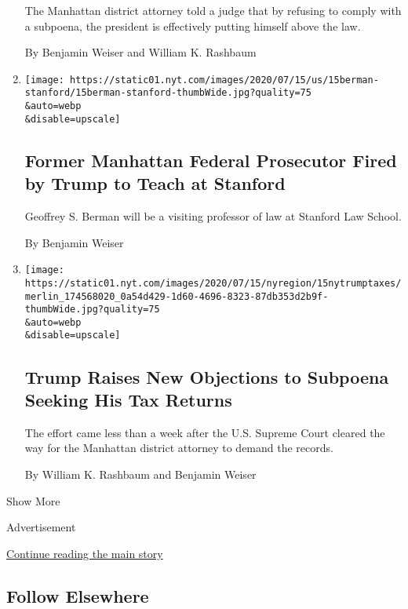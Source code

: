 \begin{enumerate}
  The Manhattan district attorney told a judge that by refusing to
  comply with a subpoena, the president is effectively putting himself
  above the law.

  By Benjamin Weiser and William K. Rashbaum
\item
  \href{/2020/07/15/us/Geoffrey-Berman-fired-stanford.html}{}

  \texttt{[image: https://static01.nyt.com/images/2020/07/15/us/15berman-stanford/15berman-stanford-thumbWide.jpg?quality=75\\\&auto=webp\\\&disable=upscale]}

  \hypertarget{former-manhattan-federal-prosecutor-fired-by-trump-to-teach-at-stanford}{%
  \subsection{Former Manhattan Federal Prosecutor Fired by Trump to
  Teach at
  Stanford}\label{former-manhattan-federal-prosecutor-fired-by-trump-to-teach-at-stanford}}

  Geoffrey S. Berman will be a visiting professor of law at Stanford Law
  School.

  By Benjamin Weiser
\item
  \href{/2020/07/15/nyregion/donald-trump-taxes-cyrus-vance.html}{}

  \texttt{[image: https://static01.nyt.com/images/2020/07/15/nyregion/15nytrumptaxes/merlin\_174568020\_0a54d429-1d60-4696-8323-87db353d2b9f-thumbWide.jpg?quality=75\\\&auto=webp\\\&disable=upscale]}

  \hypertarget{trump-raises-new-objections-to-subpoena-seeking-his-tax-returns}{%
  \subsection{Trump Raises New Objections to Subpoena Seeking His Tax
  Returns}\label{trump-raises-new-objections-to-subpoena-seeking-his-tax-returns}}

  The effort came less than a week after the U.S. Supreme Court cleared
  the way for the Manhattan district attorney to demand the records.

  By William K. Rashbaum and Benjamin Weiser
\end{enumerate}

Show More

Advertisement

\protect\hyperlink{after-mid2}{Continue reading the main story}

\hypertarget{follow-elsewhere}{%
\subsection{Follow Elsewhere}\label{follow-elsewhere}}

